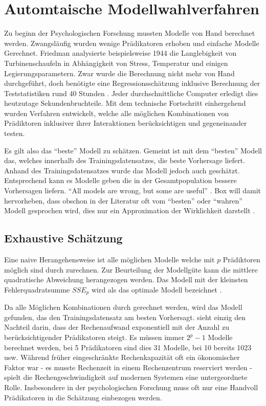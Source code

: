 \section{Automtaische Modellwahlverfahren}
Zu beginn der Psychologischen Forschung mussten Modelle von Hand berechnet werden. Zwangsläufig wurden wenige Prädikatoren erhoben und einfache Modelle Gerechnet. 
Friedman analysierte beispielsweise 1944 die Langlebigkeit von Turbinenschaufeln in Abhängigkeit von Stress, Temperatur und einigen Legierungsparametern. 
Zwar wurde die Berechnung nicht mehr von Hand durchgeführt, doch benötigte eine Regressionsschätzung inklusive Berechnung der Teststatistiken rund 40 Stunden \cite[p.2]{armstrong2011illusions}. Jeder durchschnittliche Computer erledigt dies heutzutage Sekundenbruchteile. 
Mit dem technische Fortschritt einhergehend wurden Verfahren entwickelt, welche alle möglichen Kombinationen von Prädiktoren inklusiver ihrer Interaktionen berücksichtigen und gegeneinander testen.

Es gilt also das ``beste'' Modell zu schätzen. 
Gemeint ist mit dem ``besten'' Modell das, welches innerhalb des Trainingsdatensatzes, die beste Vorhersage liefert. 
Anhand des Trainingsdatensatzes wurde das Modell jedoch auch geschätzt. Entsprechend kann es Modelle geben die in der Gesamtpopulation bessere Vorhersagen liefern. 
``All models are wrong, but some are useful'' \cite[p.202]{box1979robustness}.
Box will damit hervorheben, dass obschon in der Literatur oft vom ``besten'' oder ``wahren'' Modell gesprochen wird, dies nur ein Approximation der Wirklichkeit darstellt \cite[p.172]{weakliem2004introduction}.

\subsection{Exhaustive Schätzung} 
Eine naive Herangehensweise ist alle möglichen Modelle welche mit $p$ Prädiktoren möglich sind durch zurechnen. 
Zur Beurteilung der Modellgüte kann die mittlere quadratische Abweichung herangezogen werden.
Das Modell mit der kleinsten Fehlerquadratsumme $SSE_p$ wird als das  optimale Modell bezeichnet \cite[p. 6]{thompson1978selection}. 


Da alle Möglichen Kombinationen durch gerechnet werden, wird das  Modell gefunden, das den Trainingsdatensatz am besten Vorhersagt.
 sieht einzig den Nachteil darin, dass der Rechenaufwand exponentiell mit der Anzahl zu berücksichtigender Prädikatoren steigt. 
Es müssen immer $2^p-1$ Modelle berechnet werden, bei 5 Prädikatoren sind dies 31 Modelle, bei 10 bereits 1023 usw.
Während früher eingeschränkte Rechenkapazität oft ein ökonomischer Faktor war - es musste Rechenzeit in einem Rechenzentrum reserviert werden - spielt die Rechengeschwindigkeit auf modernen Systemen eine untergeordnete Rolle. 
Insbesondere in der psychologischen Forschung muss oft nur eine Handvoll Prädikatoren in die Schätzung einbezogen werden.

